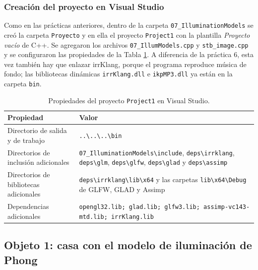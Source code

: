 \subsubsection{Creación del proyecto en Visual Studio}
Como en las prácticas anteriores, dentro de la carpeta \texttt{07\_IlluminationModels} se creó la carpeta \texttt{Proyecto} y en ella el proyecto \texttt{Project1} con la plantilla \textit{Proyecto vacío} de C++. Se agregaron los archivos \texttt{07\_IllumModels.cpp} y \texttt{stb\_image.cpp} y se configuraron las propiedades de la Tabla \ref{tab:propiedades}. A diferencia de la práctica 6, esta vez también hay que enlazar irrKlang, porque el programa reproduce música de fondo; las bibliotecas dinámicas \texttt{irrKlang.dll} e \texttt{ikpMP3.dll} ya están en la carpeta \texttt{bin}.

\begin{table}[H]
\centering
\renewcommand{\arraystretch}{1.25}
\begin{tabular}{|p{5.2cm}|p{9.5cm}|}
\hline
\textbf{Propiedad} & \textbf{Valor} \\ \hline
Directorio de salida y de trabajo & \texttt{..\textbackslash..\textbackslash..\textbackslash bin} \\ \hline
Directorios de inclusión adicionales & \texttt{07\_IlluminationModels\textbackslash include}, \texttt{deps\textbackslash irrklang}, \texttt{deps\textbackslash glm}, \texttt{deps\textbackslash glfw}, \texttt{deps\textbackslash glad} y \texttt{deps\textbackslash assimp} \\ \hline
Directorios de bibliotecas adicionales & \texttt{deps\textbackslash irrklang\textbackslash lib\textbackslash x64} y las carpetas \texttt{lib\textbackslash x64\textbackslash Debug} de GLFW, GLAD y Assimp \\ \hline
Dependencias adicionales & \texttt{opengl32.lib; glad.lib; glfw3.lib; assimp-vc143-mtd.lib; irrKlang.lib} \\ \hline
\end{tabular}
\caption{Propiedades del proyecto \texttt{Project1} en Visual Studio.}
\label{tab:propiedades}
\end{table}

\subsection{Objeto 1: casa con el modelo de iluminación de Phong}

